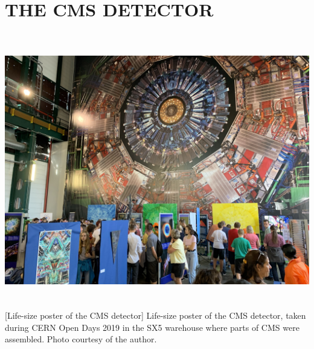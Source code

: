 \chapter{THE CMS DETECTOR} 
\label{ch:cms}

\begin{multiFigure}
    \centering
        \includegraphics[height=12cm]{figures/cms/cms_poster_SX5.jpg}
        [Life-size poster of the CMS detector]
        {Life-size poster of the CMS detector, taken during CERN Open Days 2019 in the SX5 warehouse where parts of CMS were assembled.
        Photo courtesy of the author.}
    \label{fig:cms_poster}
\end{multiFigure}

